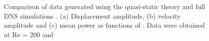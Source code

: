 \begin{figure}
  \setlength{\unitlength}{\textwidth}
  \caption{Comparison of data generated using the quasi-static theory and full DNS simulations . (a) Displacement amplitude, (b) velocity amplitude and (c) mean power as functions of \massdamp. Data were
  obtained at Re = 200 and  }
    \label{fig:qss_fsi}
\end{figure}


